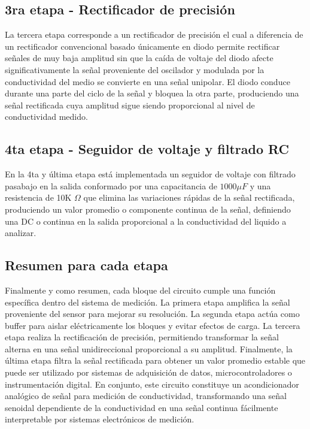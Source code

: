 \subsection{3ra etapa - Rectificador de precisión}

La tercera etapa corresponde a un rectificador de precisión el cual a diferencia de un rectificador convencional basado únicamente en diodo permite rectificar señales de muy baja amplitud sin que la caída de voltaje del diodo afecte significativamente la señal proveniente del oscilador y modulada por la conductividad del medio se convierte en una señal unipolar. El diodo conduce durante una parte del ciclo de la señal y bloquea la otra parte, produciendo una señal rectificada cuya amplitud sigue siendo proporcional al nivel de conductividad medido.


\subsection{4ta etapa - Seguidor de voltaje y filtrado RC}

En la 4ta y última etapa está implementada un seguidor de voltaje con filtrado pasabajo en la salida conformado por una capacitancia de $1000\mu F$ y una resistencia de 10K $\Omega$ que elimina las variaciones rápidas de la señal rectificada, produciendo un valor promedio o componente continua de la señal, definiendo una DC o continua en la salida proporcional a la conductividad del liquido a analizar.

\subsection{Resumen para cada etapa}

Finalmente y como resumen, cada bloque del circuito cumple una función específica dentro del sistema de medición. La primera etapa amplifica la señal proveniente del sensor para mejorar su resolución. La segunda etapa actúa como buffer para aislar eléctricamente los bloques y evitar efectos de carga. La tercera etapa realiza la rectificación de precisión, permitiendo transformar la señal alterna en una señal unidireccional proporcional a su amplitud. Finalmente, la última etapa filtra la señal rectificada para obtener un valor promedio estable que puede ser utilizado por sistemas de adquisición de datos, microcontroladores o instrumentación digital. En conjunto, este circuito constituye un acondicionador analógico de señal para medición de conductividad, transformando una señal senoidal dependiente de la conductividad en una señal continua fácilmente interpretable por sistemas electrónicos de medición.


